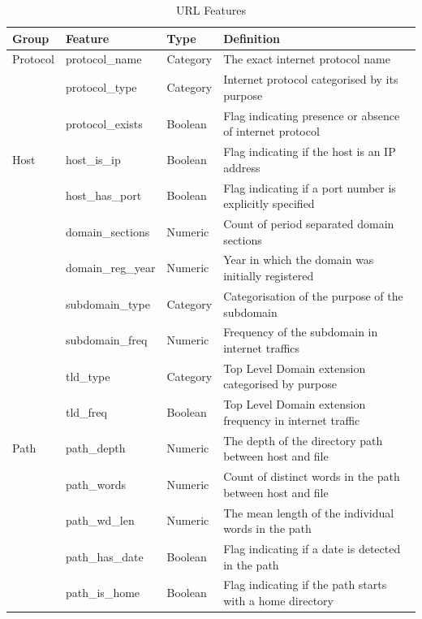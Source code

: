 \documentclass[sigconf]{acmart}
\begin{document}
\begin{table}
\caption{URL Features}
\label{tab:features}
\begin{tabular}{|l|l|l|l|}
\toprule
Group         &Feature              &Type        &Definition  \\
\midrule
Protocol      &protocol\_name         &Category    &The exact internet protocol name    \\
              &protocol\_type         &Category    &Internet protocol categorised by its purpose    \\
              &protocol\_exists       &Boolean     &Flag indicating presence or absence of internet protocol   \\
\midrule
Host          &host\_is\_ip           &Boolean     &Flag indicating if the host is an IP address    \\
              &host\_has\_port        &Boolean     &Flag indicating if a port number is explicitly specified    \\
              &domain\_sections       &Numeric     &Count of period separated domain sections    \\
              &domain\_reg\_year      &Numeric     &Year in which the domain was initially registered    \\
              &subdomain\_type        &Category    &Categorisation of the purpose of the subdomain \\
              &subdomain\_freq        &Numeric     &Frequency of the subdomain in internet traffics    \\
              &tld\_type              &Category    &Top Level Domain extension categorised by purpose    \\
              &tld\_freq              &Boolean     &Top Level Domain extension frequency in internet traffic   \\
\midrule
Path          &path\_depth            &Numeric     &The depth of the directory path between host and file   \\
              &path\_words            &Numeric     &Count of distinct words in the path between host and file   \\
              &path\_wd\_len          &Numeric     &The mean length of the individual words in the path  \\
              &path\_has\_date        &Boolean     &Flag indicating if a date is detected in the path  \\
              &path\_is\_home         &Boolean     &Flag indicating if the path starts with a home directory    \\

\end{tabular}
\end{table}
\end{document}
